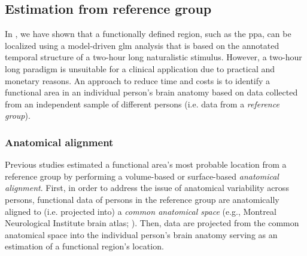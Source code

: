 \subsection{Estimation from reference group}


In \citet{haeusler2022processing}, we have shown that a functionally defined
region, such as the \ac{ppa}, can be localized using a model-driven \ac{glm}
analysis that is based on the annotated temporal structure of a two-hour long
naturalistic stimulus.
However, a two-hour long paradigm is unsuitable for a clinical application due
to practical and monetary reasons.
An approach to reduce time and costs is to identify a functional area in an
individual person's brain anatomy based on data collected from an independent
sample of different persons (i.e. data from a \textit{reference group}).



\subsubsection{Anatomical alignment}

Previous studies estimated a functional area's most probable location from a
reference group by performing a volume-based
\citep[e.g.,][]{zhen2017quantifying, zhen2015quantifying} or surface-based
\citep[e.g.,][]{frost2012measuring, weiner2018defining,
rosenke2021probabilistic, wang2015probabilistic} \textit{anatomical alignment}.
%
First, in order to address the issue of anatomical variability across persons,
functional data of persons in the reference group are anatomically aligned to
(i.e.  projected into) a \textit{common anatomical space} (e.g., Montreal
Neurological Institute brain atlas; \citep[MNI152,][]{fonov2011unbiased}).
Then, data are projected from the common anatomical space into the individual
person's brain anatomy serving as an estimation of a functional region's
location.

